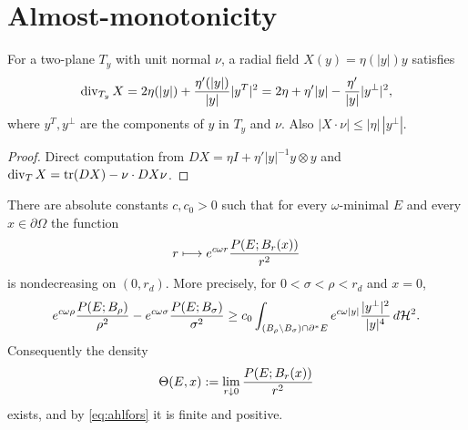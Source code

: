 \section{Almost-monotonicity}

\begin{lemma}\label{lem:radial-divergence}
For a two-plane $T_y$ with unit normal $\nu$, a radial field
$X(y)=\eta(|y|)y$ satisfies
\begin{equation}\label{eq:radial-divergence}
  \operatorname{div}_{T_y}X
  =2\eta(|y|)+\frac{\eta'(|y|)}{|y|}|y^T|^2
  =2\eta+\eta'|y|-\frac{\eta'}{|y|}|y^\perp|^2 ,
\end{equation}
where $y^T,y^\perp$ are the components of $y$ in $T_y$ and $\nu$.  Also
$|X\cdot\nu|\le|\eta|\,|y^\perp|$.
\end{lemma}

\begin{proof}
Direct computation from $DX=\eta I+\eta'|y|^{-1}y\otimes y$ and
$\operatorname{div}_TX=\operatorname{tr}(DX)-\nu\cdot DX\nu$.
\end{proof}

\begin{theorem}\label{thm:monotonicity}
There are absolute constants $c,c_0>0$ such that for every $\omega$-minimal
$E$ and every $x\in\partial\Omega$ the function
\begin{equation}\label{eq:monotone-quantity}
  r\longmapsto e^{c\omega r}\frac{P(E;B_r(x))}{r^2}
\end{equation}
is nondecreasing on $(0,r_d)$.  More precisely, for
$0<\sigma<\rho<r_d$ and $x=0$,
\begin{equation}\label{eq:monotonicity-quantitative}
  e^{c\omega\rho}\frac{P(E;B_\rho)}{\rho^2}
  -e^{c\omega\sigma}\frac{P(E;B_\sigma)}{\sigma^2}
  \ge c_0\int_{(B_\rho\setminus B_\sigma)\cap\partial^* E}
     e^{c\omega|y|}\frac{|y^\perp|^2}{|y|^4}\,d\mathcal H^2 .
\end{equation}
Consequently the density
\begin{equation}\label{eq:theta-density}
  \Theta(E,x):=\lim_{r\downarrow0}\frac{P(E;B_r(x))}{r^2}
\end{equation}
exists, and by \eqref{eq:ahlfors} it is finite and positive.
\end{theorem}

